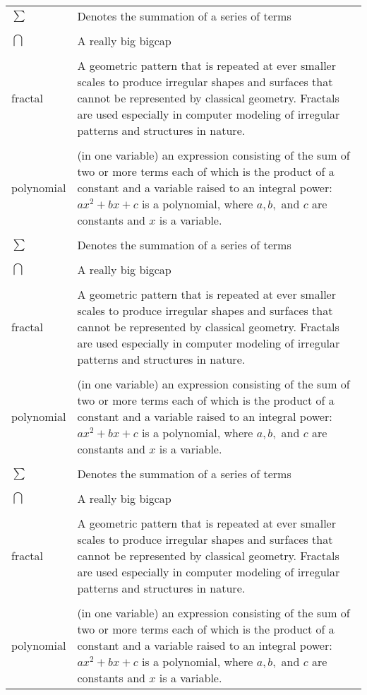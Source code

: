 \singlespacing
\begin{tabular}{lp{5in}} %
$\sum$ & Denotes the summation of a series of terms\\
\\%
$\bigcap$ & A really big bigcap\\
\\
fractal & A geometric pattern that is repeated at ever smaller
scales to produce irregular shapes and surfaces that cannot be represented by classical
geometry. Fractals are used especially in computer modeling of irregular patterns and structures in nature.}\\
\\
polynomial & (in one variable) an expression consisting of the sum of two
or more terms each of which is the product of a constant and a
variable raised to an integral power: $ax^2 + bx + c$ is a
polynomial, where $a, b,$ and $c$ are constants and $x$ is a
variable.}\\
\\
$\sum$ & Denotes the summation of a series of terms\\
\\
$\bigcap$ & A really big bigcap\\
\\
fractal & A geometric pattern that is repeated at ever smaller
scales to produce irregular shapes and surfaces that cannot be represented by classical
geometry. Fractals are used especially in computer modeling of irregular patterns and structures in nature.}\\
\\
polynomial & (in one variable) an expression consisting of the sum of two
or more terms each of which is the product of a constant and a
variable raised to an integral power: $ax^2 + bx + c$ is a
polynomial, where $a, b,$ and $c$ are constants and $x$ is a
variable.}\\
\\
$\sum$ & Denotes the summation of a series of terms\\
\\
$\bigcap$ & A really big bigcap\\
\\
fractal & A geometric pattern that is repeated at ever smaller
scales to produce irregular shapes and surfaces that cannot be represented by classical
geometry. Fractals are used especially in computer modeling of irregular patterns and structures in nature.}\\
\\
polynomial & (in one variable) an expression consisting of the sum of two
or more terms each of which is the product of a constant and a
variable raised to an integral power: $ax^2 + bx + c$ is a
polynomial, where $a, b,$ and $c$ are constants and $x$ is a
variable.}\\
\end{tabular}

